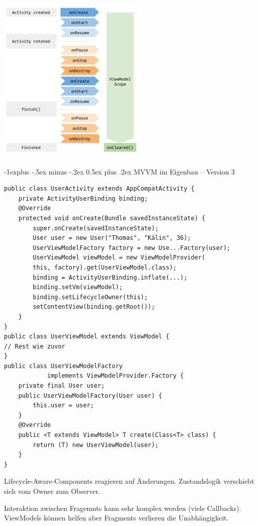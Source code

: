 \documentclass[10pt,landscape,a4paper]{article}
\makeatletter
\renewcommand{\subsection}{\@startsection{subsection}{2}{0mm}%
                                {-1explus -.5ex minus -.2ex}%
                                {0.5ex plus .2ex}%
                                {\normalfont\small\bfseries}}
\makeatother
\begin{document}
\begin{multicols*}{3}
\includegraphics[scale=1]{Bilder/Viewmodel.PNG}

\subsection{MVVM im Eigenbau – Version 3}
\begin{verbatim}
public class UserActivity extends AppCompatActivity {
    private ActivityUserBinding binding;
    @Override
    protected void onCreate(Bundle savedInstanceState) {
        super.onCreate(savedInstanceState);
        User user = new User("Thomas", "Kälin", 36);
        UserViewModelFactory factory = new Use...Factory(user);
        UserViewModel viewModel = new ViewModelProvider(
        this, factory).get(UserViewModel.class);
        binding = ActivityUserBinding.inflate(...);
        binding.setVm(viewModel);
        binding.setLifecycleOwner(this);
        setContentView(binding.getRoot());
    }
}
public class UserViewModel extends ViewModel {
// Rest wie zuvor
}
public class UserViewModelFactory
            implements ViewModelProvider.Factory {
    private final User user;
    public UserViewModelFactory(User user) {
        this.user = user;
    }
    @Override
    public <T extends ViewModel> T create(Class<T> class) {
        return (T) new UserViewModel(user);
    }
}
\end{verbatim}
Lifecycle-Aware-Components reagieren auf Änderungen. Zustandslogik verschiebt sich vom Owner zum Observer. 

Interaktion zwischen Fragemnts kann sehr komplex werden (viele Callbacks). ViewModels können helfen aber Fragments verlieren die Unabhängigkeit.


\end{multicols*}
\end{document}
